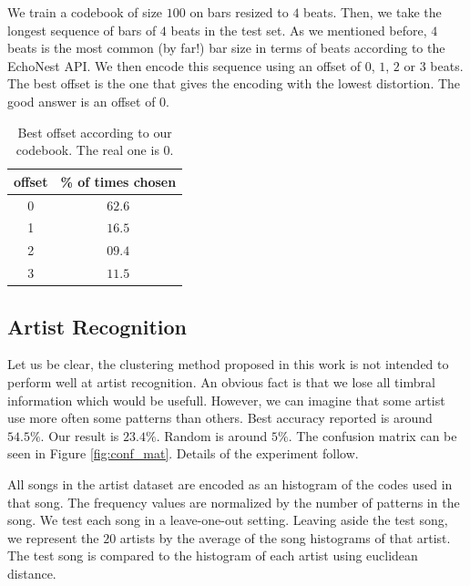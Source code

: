 \documentclass{article}
\begin{document}
We train a codebook of size $100$ on bars resized to $4$ beats. Then,
we take the longest sequence of bars of $4$ beats in the test set.
As we mentioned before, $4$ beats is the most common (by far!) bar size
in terms of beats according to the EchoNest API. We then encode this
sequence using an offset of $0$, $1$, $2$ or $3$ beats. The best offset
is the one that gives the encoding with the lowest distortion. The
good answer is an offset of $0$.

\begin{table}
\begin{center}
\begin{tabular}{c|c}
offset & \% of times chosen \\ \hline
0 & $\mathbf{62.6}$\\
1 & $16.5$\\
2 & $09.4$\\
3 & $11.5$\\
\end{tabular}
\end{center}
\caption{\small{
Best offset according to our codebook. The real one is $0$.
}}
\label{tab:offset}
\end{table}

\subsection{Artist Recognition}
Let us be clear, the clustering method proposed in this work is not
intended to perform well at artist recognition. An obvious fact is that
we lose all timbral information which would be usefull. However, we can
imagine that some artist use more often some patterns than others.
Best accuracy reported is around $54.5\%$. Our result is $23.4\%$. Random
is around $5\%$. The confusion matrix can be seen in Figure \ref{fig:conf_mat}.
Details of the experiment follow.

All songs in the artist dataset are encoded as an histogram of the codes
used in that song. The frequency values are normalized by the number
of patterns in the song. We test each song in a leave-one-out setting.
Leaving aside the test song, we represent the $20$ artists by the average of
the song histograms of that artist. The test song is compared to
the histogram of each artist using euclidean distance.
\end{document}
